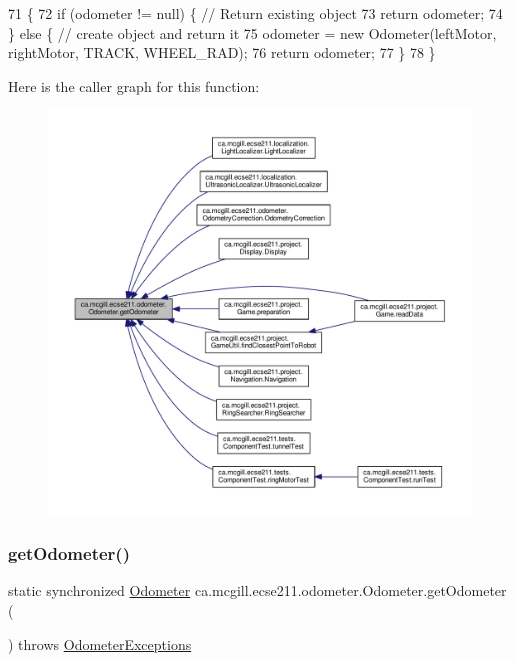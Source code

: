 \begin{DoxyCode}
71                                 \{
72     \textcolor{keywordflow}{if} (odometer != null) \{ \textcolor{comment}{// Return existing object}
73       \textcolor{keywordflow}{return} odometer;
74     \} \textcolor{keywordflow}{else} \{ \textcolor{comment}{// create object and return it}
75       odometer = \textcolor{keyword}{new} Odometer(leftMotor, rightMotor, TRACK, WHEEL\_RAD);
76       \textcolor{keywordflow}{return} odometer;
77     \}
78   \}
\end{DoxyCode}
Here is the caller graph for this function\+:\nopagebreak
\begin{figure}[H]
\begin{center}
\leavevmode
\includegraphics[width=350pt]{classca_1_1mcgill_1_1ecse211_1_1odometer_1_1_odometer_a99171f11e34dea918fa9dd069d721439_icgraph}
\end{center}
\end{figure}
\mbox{\label{classca_1_1mcgill_1_1ecse211_1_1odometer_1_1_odometer_a4e069b5a96cd43b29af0785244a99b51}} 
\subsubsection{\texorpdfstring{get\+Odometer()}{getOdometer()}\hspace{0.1cm}{\footnotesize\ttfamily [2/2]}}
{\footnotesize\ttfamily static synchronized \hyperlink{classca_1_1mcgill_1_1ecse211_1_1odometer_1_1_odometer}{Odometer} ca.\+mcgill.\+ecse211.\+odometer.\+Odometer.\+get\+Odometer (\begin{DoxyParamCaption}{ }\end{DoxyParamCaption}) throws \hyperlink{classca_1_1mcgill_1_1ecse211_1_1odometer_1_1_odometer_exceptions}{Odometer\+Exceptions}\hspace{0.3cm}{\ttfamily [static]}}

